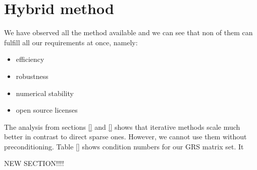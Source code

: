 \section{Hybrid method}
\label{subseq:choice-and-motivation}

We have observed all the method available and we can see that non of them can fulfill all our requirements at once, namely:

\begin{itemize}
	\item efficiency
	\item robustness
	\item numerical stability
	\item open source licenses
\end{itemize}

The analysis from sections \ref{} and \ref{} shows that iterative methods scale much better in contrast to direct sparse ones. However, we cannot use them without preconditioning. Table \ref{} shows condition numbers for our GRS matrix set. It 


NEW SECTION!!!!



\newpage

